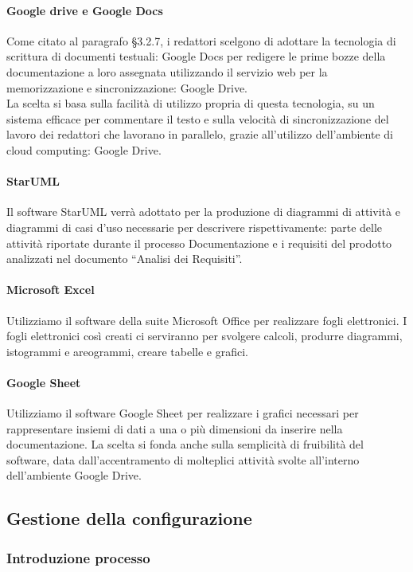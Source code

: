 			\paragraph{Google drive e Google Docs}
				Come citato al paragrafo §3.2.7, i redattori scelgono di adottare la tecnologia di scrittura di documenti testuali: Google Docs per redigere le prime bozze della documentazione a loro assegnata utilizzando il servizio web per la memorizzazione e sincronizzazione: Google Drive. \\
				La scelta si basa sulla facilità di utilizzo propria di questa tecnologia, su un sistema efficace per commentare il testo e sulla velocità di sincronizzazione del lavoro dei redattori che lavorano in parallelo, grazie all’utilizzo dell’ambiente di cloud computing: Google Drive. \\
			\paragraph{StarUML}
				Il software StarUML verrà adottato per la produzione di diagrammi di attività e diagrammi di casi d’uso necessarie per descrivere rispettivamente: parte delle attività riportate durante il processo Documentazione e i requisiti del prodotto analizzati nel documento “Analisi dei Requisiti”.
			\paragraph{Microsoft Excel}
				Utilizziamo il software della suite Microsoft Office per realizzare fogli elettronici. I fogli elettronici così creati ci serviranno per svolgere calcoli, produrre diagrammi, istogrammi e areogrammi, creare tabelle e grafici.
			\paragraph{Google Sheet}
				Utilizziamo il software Google Sheet per realizzare i grafici necessari per rappresentare insiemi di dati a una o più dimensioni da inserire nella documentazione. La scelta si fonda anche sulla semplicità di fruibilità del software, data dall’accentramento di molteplici attività svolte all’interno dell’ambiente Google Drive.

	\subsection{Gestione della configurazione}
		\subsubsection{Introduzione processo}
